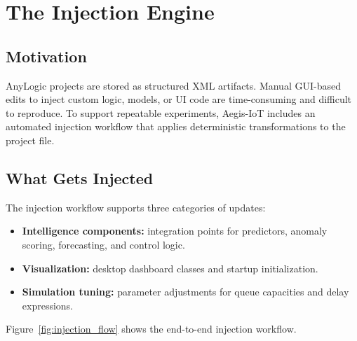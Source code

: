 \chapter{The Injection Engine}

\section{Motivation}

AnyLogic projects are stored as structured XML artifacts. Manual GUI-based edits to inject custom logic, models, or UI code are time-consuming and difficult to reproduce. To support repeatable experiments, Aegis-IoT includes an automated injection workflow that applies deterministic transformations to the project file.

\section{What Gets Injected}

The injection workflow supports three categories of updates:
\begin{itemize}
    \item \textbf{Intelligence components:} integration points for predictors, anomaly scoring, forecasting, and control logic.
    \item \textbf{Visualization:} desktop dashboard classes and startup initialization.
    \item \textbf{Simulation tuning:} parameter adjustments for queue capacities and delay expressions.
\end{itemize}

Figure~\ref{fig:injection_flow} shows the end-to-end injection workflow.

